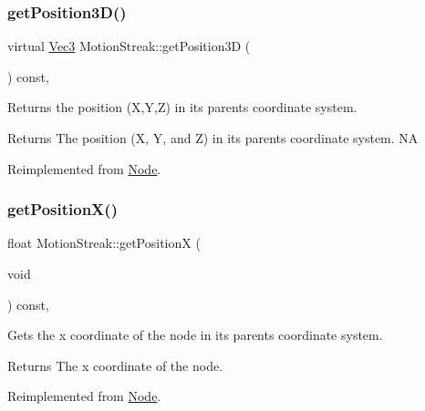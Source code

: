 \subsubsection{\texorpdfstring{get\+Position3\+D()}{getPosition3D()}\hspace{0.1cm}{\footnotesize\ttfamily [2/2]}}
{\footnotesize\ttfamily virtual \hyperlink{classVec3}{Vec3} Motion\+Streak\+::get\+Position3D (\begin{DoxyParamCaption}{ }\end{DoxyParamCaption}) const\hspace{0.3cm}{\ttfamily [override]}, {\ttfamily [virtual]}}

Returns the position (X,Y,Z) in its parent\textquotesingle{}s coordinate system.

\begin{DoxyReturn}{Returns}
The position (X, Y, and Z) in its parent\textquotesingle{}s coordinate system.  NA 
\end{DoxyReturn}


Reimplemented from \hyperlink{classNode_a8617dd2eb9af75a66ebaff0d3c99285e}{Node}.

\mbox{\label{classMotionStreak_a0a7f37b3a4e479cfed0dea79222ad1e6}} 
\subsubsection{\texorpdfstring{get\+Position\+X()}{getPositionX()}\hspace{0.1cm}{\footnotesize\ttfamily [1/2]}}
{\footnotesize\ttfamily float Motion\+Streak\+::get\+PositionX (\begin{DoxyParamCaption}\item[{void}]{ }\end{DoxyParamCaption}) const\hspace{0.3cm}{\ttfamily [override]}, {\ttfamily [virtual]}}

Gets the x coordinate of the node in its parent\textquotesingle{}s coordinate system.

\begin{DoxyReturn}{Returns}
The x coordinate of the node. 
\end{DoxyReturn}


Reimplemented from \hyperlink{classNode_ad4b27cd8bc98960789fbd2b574666a25}{Node}.

